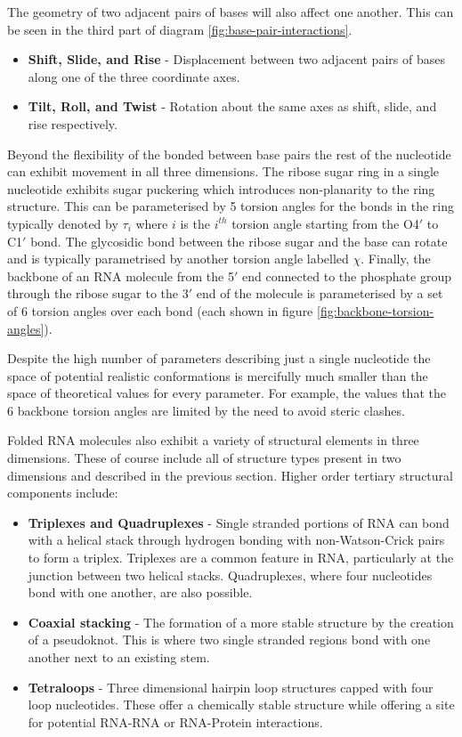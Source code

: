 \documentclass[journal]{IEEEtran}
\begin{document}
The geometry of two adjacent pairs of bases will also affect one another. This can be seen in the third part of diagram \ref{fig:base-pair-interactions}.

\begin{itemize}
	\item \textbf{Shift, Slide, and Rise} - Displacement between two adjacent pairs of bases along one of the three coordinate axes.
	\item \textbf{Tilt, Roll, and Twist} - Rotation about the same axes as shift, slide, and rise respectively.
\end{itemize}

Beyond the flexibility of the bonded between base pairs the rest of the nucleotide can exhibit movement in all three dimensions. The ribose sugar ring in a single nucleotide exhibits sugar puckering which introduces non-planarity to the ring structure. This can be parameterised by 5 torsion angles for the bonds in the ring typically denoted by $\tau_i$ where $i$ is the $i^{th}$ torsion angle starting from the O4$'$ to C1$'$ bond. The glycosidic bond between the ribose sugar and the base can rotate and is typically parametrised by another torsion angle labelled $\chi$. Finally, the backbone of an RNA molecule from the 5$'$ end connected to the phosphate group through the ribose sugar to the 3$'$ end of the molecule is parameterised by a set of 6 torsion angles over each bond (each shown in figure \ref{fig:backbone-torsion-angles}).

Despite the high number of parameters describing just a single nucleotide the space of potential realistic conformations is mercifully much smaller than the space of theoretical values for every parameter. For example, the values that the 6 backbone torsion angles are limited by the need to avoid steric clashes.

Folded RNA molecules also exhibit a variety of structural elements in three dimensions. These of course include all of structure types present in two dimensions and described in the previous section. Higher order tertiary structural components include:

\begin{itemize}
	\item \textbf{Triplexes and Quadruplexes} - Single stranded portions of RNA can bond with a helical stack through hydrogen bonding with non-Watson-Crick pairs to form a triplex. Triplexes are a common feature in RNA, particularly at the junction between two helical stacks. Quadruplexes, where four nucleotides bond with one another, are also possible.
	\item \textbf{Coaxial stacking} - The formation of a more stable structure by the creation of a pseudoknot. This is where two single stranded regions bond with one another next to an existing stem.
	\item \textbf{Tetraloops} - Three dimensional hairpin loop structures capped with four loop nucleotides. These offer a chemically stable structure while offering a site for potential RNA-RNA or RNA-Protein interactions.
\end{itemize}
\end{document}
